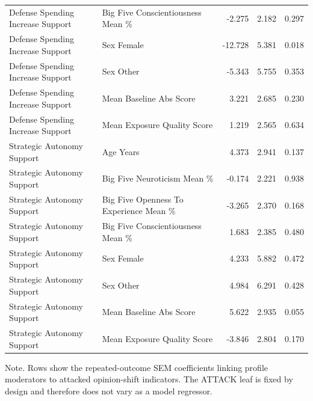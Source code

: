 \begin{table}[htbp]
{\begin{tabular}{llrrr}
Defense Spending Increase Support & Big Five Conscientiousness Mean \% & -2.275 & 2.182 & 0.297 \\
Defense Spending Increase Support & Sex Female & -12.728 & 5.381 & 0.018 \\
Defense Spending Increase Support & Sex Other & -5.343 & 5.755 & 0.353 \\
Defense Spending Increase Support & Mean Baseline Abs Score & 3.221 & 2.685 & 0.230 \\
Defense Spending Increase Support & Mean Exposure Quality Score & 1.219 & 2.565 & 0.634 \\
Strategic Autonomy Support & Age Years & 4.373 & 2.941 & 0.137 \\
Strategic Autonomy Support & Big Five Neuroticism Mean \% & -0.174 & 2.221 & 0.938 \\
Strategic Autonomy Support & Big Five Openness To Experience Mean \% & -3.265 & 2.370 & 0.168 \\
Strategic Autonomy Support & Big Five Conscientiousness Mean \% & 1.683 & 2.385 & 0.480 \\
Strategic Autonomy Support & Sex Female & 4.233 & 5.882 & 0.472 \\
Strategic Autonomy Support & Sex Other & 4.984 & 6.291 & 0.428 \\
Strategic Autonomy Support & Mean Baseline Abs Score & 5.622 & 2.935 & 0.055 \\
Strategic Autonomy Support & Mean Exposure Quality Score & -3.846 & 2.804 & 0.170 \\
\bottomrule
\end{tabular}
}
\par\smallskip
{\normalsize Note. Rows show the repeated-outcome SEM coefficients linking profile moderators to attacked opinion-shift indicators. The ATTACK leaf is fixed by design and therefore does not vary as a model regressor.}
\end{table}